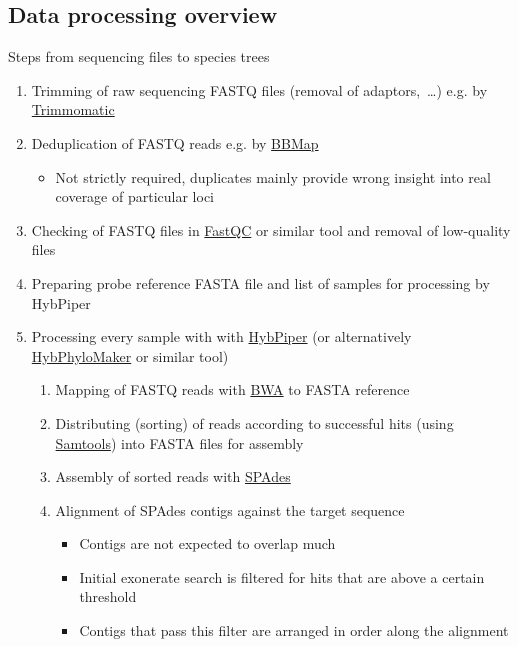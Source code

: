 \documentclass[compress, ucs, xelatex, 11pt, xcolor=x11names, aspectratio=1609,
	hyperref={
		bookmarks=true,
		unicode=true,
		colorlinks=true,
		pdftitle={HybSeq course},
		plainpages=false,
		pdfauthor={Vojtech Zeisek},
		pdfsubject={Practical processing of HybSeq target enrichment sequencing data on computing grids like MetaCentrum},
		pdfcreator={XeLaTeX},
		pdfkeywords={BASH, command line, GNU, HybSeq, Linux, MetaCentrum, sequencing shell, target enrichment},
		linkcolor=Cyan2, %
		anchorcolor=Firebrick2, %
		citecolor=Firebrick2, %
		filecolor=Firebrick2, %
		menucolor=Firebrick2, %
		urlcolor=Chartreuse2, %
		pdftex},
	url={hyphens, lowtilde} %
	]{beamer}
\begin{document}
\subsection{Data processing overview}

\begin{frame}[allowframebreaks]{Steps from sequencing files to species trees}
	\begin{enumerate}
		\item Trimming of raw sequencing FASTQ files (removal of adaptors,~\ldots) e.g. by \href{http://www.usadellab.org/cms/?page=trimmomatic}{Trimmomatic}
		\item Deduplication of FASTQ reads e.g. by \href{https://sourceforge.net/projects/bbmap/}{BBMap}
		\begin{itemize}
			\item Not strictly required, duplicates mainly provide wrong insight into real coverage of particular loci
		\end{itemize}
		\item Checking of FASTQ files in \href{https://www.bioinformatics.babraham.ac.uk/projects/fastqc/}{FastQC} or similar tool and removal of low-quality files
		\item Preparing probe reference FASTA file and list of samples for processing by HybPiper
		\item Processing every sample with with \href{https://github.com/mossmatters/HybPiper/wiki}{HybPiper} (or alternatively \href{https://github.com/tomas-fer/HybPhyloMaker}{HybPhyloMaker} or similar tool)
		\begin{enumerate}
			\item Mapping of FASTQ reads with \href{https://github.com/lh3/bwa}{BWA} to FASTA reference
			\item Distributing (sorting) of reads according to successful hits (using \href{https://github.com/samtools/samtools}{Samtools}) into FASTA files for assembly
			\item Assembly of sorted reads with \href{https://github.com/ablab/spades}{SPAdes}
			\item Alignment of SPAdes contigs against the target sequence
			\begin{itemize}
				\item Contigs are not expected to overlap much
				\item Initial exonerate search is filtered for hits that are above a certain threshold
				\item Contigs that pass this filter are arranged in order along the alignment

\end{itemize}
\end{enumerate}
\end{enumerate}
\end{frame}
\end{document}
